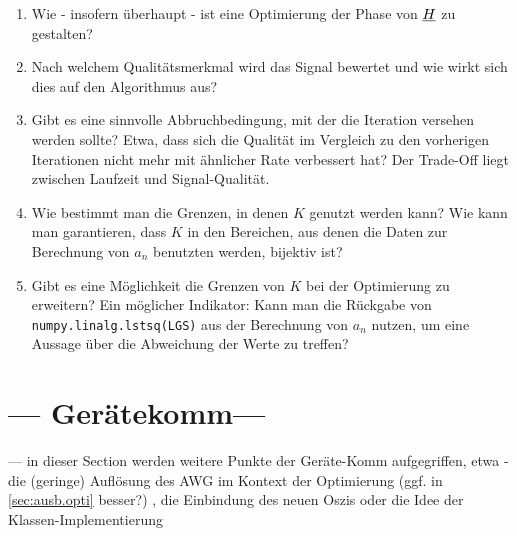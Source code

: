 \documentclass[../Report.tex]{subfiles}
\begin{document}
\begin{enumerate}
	\item 	Wie - insofern überhaupt - ist eine Optimierung der Phase von $\underline{H}$ zu gestalten?
	
	\item	Nach welchem Qualitätsmerkmal wird das Signal bewertet und wie wirkt sich dies auf den Algorithmus aus?
	
	\item	Gibt es eine sinnvolle Abbruchbedingung, mit der die Iteration versehen werden sollte? Etwa, dass sich die Qualität im Vergleich zu den vorherigen Iterationen nicht mehr mit ähnlicher Rate verbessert hat? Der Trade-Off liegt zwischen Laufzeit und Signal-Qualität.
	
	\item	Wie bestimmt man die Grenzen, in denen $K$ genutzt werden kann? Wie kann man garantieren, dass $K$ in den Bereichen, aus denen die Daten zur Berechnung von $a_n$ benutzten werden, bijektiv ist?
	
	\item	Gibt es eine Möglichkeit die Grenzen von $K$ bei der Optimierung zu erweitern? Ein möglicher Indikator: Kann man die Rückgabe von \lstinline{numpy.linalg.lstsq(LGS)} aus der Berechnung von $a_n$ nutzen, um eine Aussage über die Abweichung der Werte zu treffen?
\end{enumerate}





\section{--- Gerätekomm---}
\label{sec:ausb.geraete}
--- in dieser Section werden weitere Punkte der Geräte-Komm aufgegriffen, etwa - die (geringe) Auflösung des AWG im Kontext der Optimierung (ggf. in \ref{sec:ausb.opti} besser?) , die Einbindung des neuen Oszis oder die Idee der Klassen-Implementierung 

\end{document}
